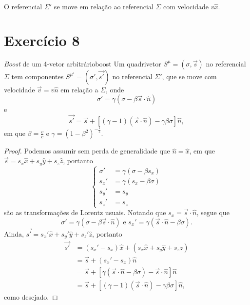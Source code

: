 \documentclass[12pt,a4paper]{article}
\numberwithin{equation}{section}
\begin{document}
O referencial \(\Sigma'\) se move em relação ao referencial \(\Sigma\) com velocidade \(v\hat{x}\).

\section*{Exercício 8}

\begin{proposition}{\textit{Boost} de um 4-vetor arbitrário}{boost}
    Um quadrivetor \(S^\mu = (\sigma, \vec{s})\) no referencial \(\Sigma\) tem componentes \(S^{\mu'} = (\sigma', \vec{s'})\) no referencial \(\Sigma'\), que se move com velocidade \(\vec{v} = v\hat{n}\) em relação a \(\Sigma\), onde
    \begin{equation*}
        \sigma' = \gamma (\sigma - \beta \vec{s} \cdot \hat{n})
    \end{equation*}
    e
    \begin{equation*}
        \vec{s'} = \vec{s} + \left[(\gamma - 1)(\vec{s} \cdot \hat{n}) - \gamma \beta \sigma\right]\hat{n},
    \end{equation*}
    em que \(\beta = \frac{v}{c}\) e \(\gamma = (1 - \beta^2)^{-\frac12}\).
\end{proposition}
\begin{proof}
    Podemos assumir sem perda de generalidade que \(\hat{n} = \hat{x}\), em que \(\vec{s} = s_x \hat{x} + s_y \hat{y} + s_z \hat{z}\), portanto
    \begin{equation*}
        \left\{
        \begin{aligned}
            \sigma' &= \gamma (\sigma - \beta s_x)\\
            s_x' &= \gamma (s_x - \beta \sigma)\\
            s_y' &= s_y\\
            s_z' &= s_z
        \end{aligned}
        \right.
    \end{equation*}
    são as transformações de Lorentz usuais. Notando que \(s_x = \vec{s}\cdot\hat{n}\), segue que
    \begin{equation*}
        \sigma' = \gamma (\sigma - \beta \vec{s} \cdot\hat{n})\text{ e }s_x' = \gamma (\vec{s} \cdot \hat{n} - \beta \sigma).
    \end{equation*}
    Ainda, \(\vec{s'} = s_x' \hat{x} + s_y' \hat{y} + s_z'\hat{z}\), portanto
    \begin{align*}
        \vec{s'} &= \left(s_x' - s_x\right) \hat{x} + \left(s_x \hat{x} + s_y \hat{y} + s_z \hat{z}\right)\\
                 &= \vec{s} + \left(s_x' - s_x\right) \hat{n}\\
                 &= \vec{s} + \left[\gamma (\vec{s} \cdot \hat{n} - \beta \sigma) - \vec{s}\cdot\hat{n}\right]\hat{n}\\
                 &= \vec{s} + \left[(\gamma - 1)(\vec{s}\cdot\hat{n}) - \gamma \beta \sigma\right]\hat{n},
    \end{align*}
    como desejado.
\end{proof}
\end{document}
